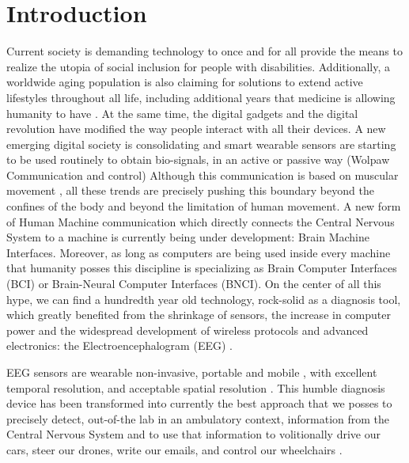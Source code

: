 \documentclass[sensors,article,submit,moreauthors,pdftex,10pt,a4paper]{mdpi}
\begin{document}

\setcounter{section}{-1} %

\section{Introduction}

Current society is demanding technology to once and for all provide the means to realize the utopia of social inclusion for people with disabilities.  Additionally, a worldwide aging population is also claiming for solutions to extend active lifestyles throughout all life, including additional years that medicine is allowing humanity to have \citep{Lutz2008}.
At the same time,  the digital gadgets and the digital revolution have modified the way people interact with all their devices.  A new emerging digital society is consolidating and smart wearable sensors are starting to be used routinely to obtain bio-signals, in an active or passive way (Wolpaw Communication and control)
Although this communication is based on muscular movement \citep{Guger2017}, all these trends are precisely pushing this boundary beyond the confines of the body and beyond the limitation of human movement.  A new form of Human Machine communication which directly connects the Central Nervous System to a machine is currently being under development: Brain Machine Interfaces.  Moreover, as long as computers are being used inside every machine that humanity posses \citep{Domingo2012} this discipline is specializing as Brain Computer Interfaces (BCI) or Brain-Neural Computer Interfaces (BNCI).
On the center of all this hype, we can find a hundredth year old technology, rock-solid as a diagnosis tool, which greatly benefited from the shrinkage of sensors, the increase in computer power and the widespread development of wireless protocols and advanced electronics: the Electroencephalogram (EEG) \citep{Schomer2010}.

EEG sensors are wearable \citep{Puce2017} non-invasive, portable and mobile \citep{DeVos2014}, with excellent temporal resolution, and acceptable spatial resolution \citep{Hartman2005}.  This humble diagnosis device has been transformed into currently the best approach that we posses to precisely detect, out-of-the lab in an ambulatory context, information from the Central Nervous System and to use that information to volitionally drive our cars, steer our drones, write our emails, and control our wheelchairs \citep{Yuste2017}.
\end{document}

